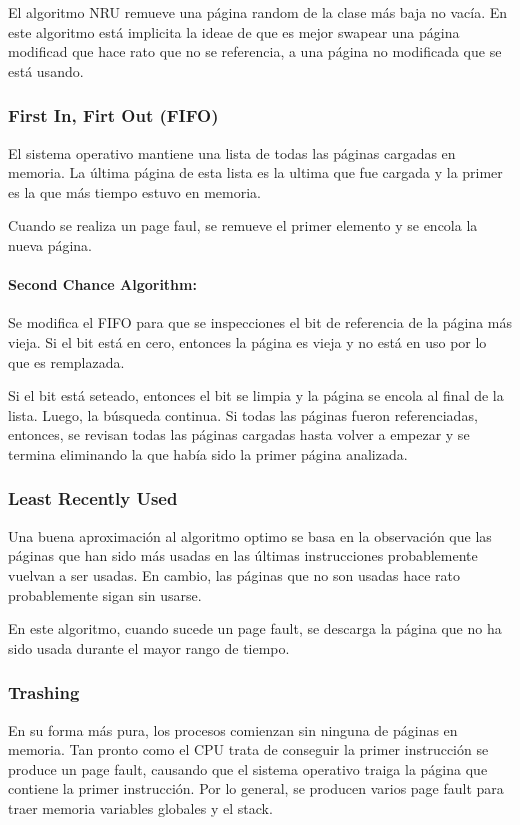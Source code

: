 El algoritmo NRU remueve una página random de la clase más baja no vacía. En este algoritmo está implicita la ideae de que es mejor swapear una página modificad que hace rato que no se referencia, a una página no modificada que se está usando.

\subsubsection{First In, Firt Out (FIFO)}
El sistema operativo mantiene una lista de todas las páginas cargadas en memoria. La última página de esta lista es la ultima que fue cargada y la primer es la que más tiempo estuvo en memoria.

Cuando se realiza un page faul, se remueve el primer elemento y se encola la nueva página.

\paragraph{Second Chance Algorithm:} Se modifica el FIFO para que se inspecciones el bit de referencia de la página más vieja. Si el bit está en cero, entonces la página es vieja y no está en uso por lo que es remplazada. 

Si el bit está seteado, entonces el bit se limpia y la página se encola al final de la lista. Luego, la búsqueda continua. Si todas las páginas fueron referenciadas, entonces, se revisan todas las páginas cargadas hasta volver a empezar y se termina eliminando la que había sido la primer página analizada.

\subsubsection{Least Recently Used}
Una buena aproximación al algoritmo optimo se basa en la observación que las páginas que han sido más usadas en las últimas instrucciones probablemente vuelvan a ser usadas. En cambio, las páginas que no son usadas hace rato probablemente sigan sin usarse.

En este algoritmo, cuando sucede un page fault, se descarga la página que no ha sido usada durante el mayor rango de tiempo.

\subsubsection{Trashing}
En su forma más pura, los procesos comienzan sin ninguna de páginas en memoria. Tan pronto como el CPU trata de conseguir la primer instrucción se produce un page fault, causando que el sistema operativo traiga la página que contiene la primer instrucción. Por lo general, se producen varios page fault para traer memoria variables globales y el stack. 

